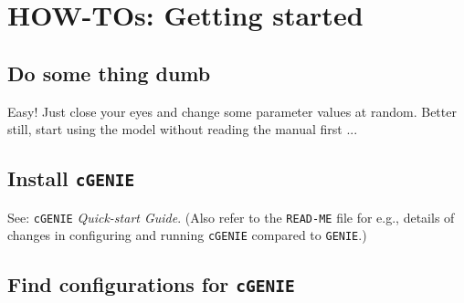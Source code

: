 \documentclass[10pt,twoside]{article}
\begin{document}
\newpage
\section{HOW-TOs: Getting started}\label{how-to-0}


\subsection{Do some thing dumb}\label{Do some thing dumb}

Easy! Just close your eyes and change some parameter values at random. Better still, start using the model without reading the manual first ...


\subsection{Install \texttt{cGENIE}}\label{Install cGENIE}

See: \texttt{cGENIE} \textit{Quick-start Guide}. (Also refer to the \texttt{READ-ME} file for e.g., details of changes in configuring and running \texttt{cGENIE} compared to \texttt{GENIE}.)


\subsection{Find configurations for \texttt{cGENIE}}\label{Find configurations for cGENIE}
\end{document}
